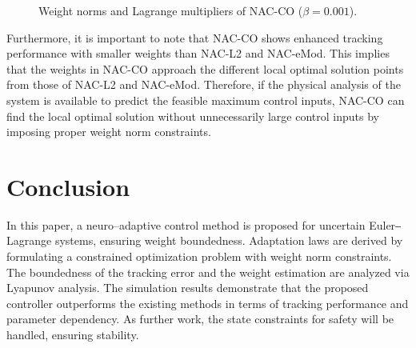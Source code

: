 \documentclass[letterpaper, 10 pt, conference]{ieeeconf}  %
\begin{document}
\begin{figure}[!t]      
    \centering
    \vspace{.1mm}
        \caption{Weight norms and Lagrange multipliers of NAC-CO ($\beta=0.001$).}
        \label{fig: weight and multiplier}
\end{figure}

Furthermore, it is important to note that NAC-CO shows enhanced tracking performance with smaller weights than NAC-L2 and NAC-eMod.
This implies that the weights in NAC-CO approach the different local optimal solution points from those of NAC-L2 and NAC-eMod.
Therefore, if the physical analysis of the system is available to predict the feasible maximum control inputs, NAC-CO can find the local optimal solution without unnecessarily large control inputs by imposing proper weight norm constraints.


\section{Conclusion}\label{sec:conclusion}

%
In this paper, a neuro–adaptive control method is proposed for uncertain Euler‒Lagrange systems, ensuring weight boundedness.
Adaptation laws are derived by formulating a constrained optimization problem with weight norm constraints.
The boundedness of the tracking error and the weight estimation are analyzed via Lyapunov analysis.
The simulation results demonstrate that the proposed controller outperforms the existing methods in terms of tracking performance and parameter dependency.
As further work, the state constraints for safety will be handled, ensuring stability.
%
\end{document}
